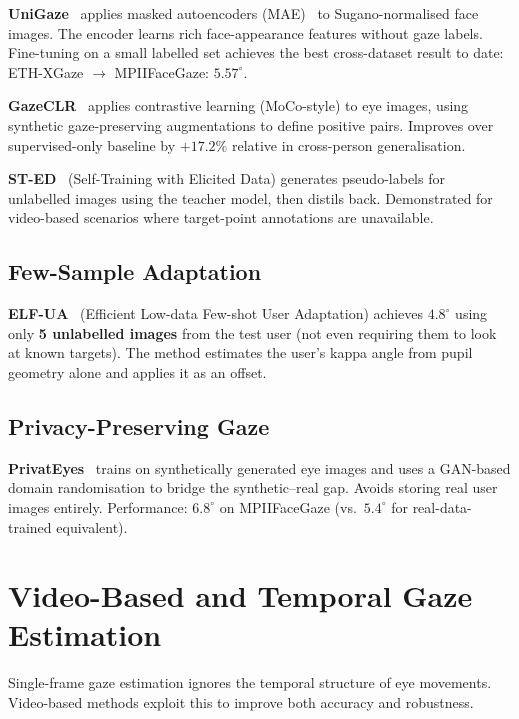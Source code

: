 \documentclass[11pt,a4paper]{article}
\begin{document}
\textbf{UniGaze}~\cite{unigaze2025} applies masked autoencoders (MAE)~\cite{he2022mae} to
Sugano-normalised face images. The encoder learns rich face-appearance features without gaze labels.
Fine-tuning on a small labelled set achieves the best cross-dataset result to date:
ETH-XGaze $\to$ MPIIFaceGaze: $5.57^\circ$.

\textbf{GazeCLR}~\cite{gaze_clr2022} applies contrastive learning (MoCo-style) to eye images,
using synthetic gaze-preserving augmentations to define positive pairs.
Improves over supervised-only baseline by $+17.2\%$ relative in cross-person generalisation.

\textbf{ST-ED}~\cite{park2020sted} (Self-Training with Elicited Data) generates pseudo-labels
for unlabelled images using the teacher model, then distils back.
Demonstrated for video-based scenarios where target-point annotations are unavailable.

\subsection{Few-Sample Adaptation}

\textbf{ELF-UA}~\cite{elfua2023} (Efficient Low-data Few-shot User Adaptation)
achieves $4.8^\circ$ using only \textbf{5 unlabelled images} from the test user (not
even requiring them to look at known targets).  The method estimates the user's kappa angle
from pupil geometry alone and applies it as an offset.

\subsection{Privacy-Preserving Gaze}

\textbf{PrivatEyes}~\cite{biswas2021privateeyes} trains on synthetically generated eye
images and uses a GAN-based domain randomisation to bridge the synthetic--real gap.
Avoids storing real user images entirely.
Performance: $6.8^\circ$ on MPIIFaceGaze (vs.\ $5.4^\circ$ for real-data-trained equivalent).

\section{Video-Based and Temporal Gaze Estimation}
\label{sec:temporal}

Single-frame gaze estimation ignores the temporal structure of eye movements.
Video-based methods exploit this to improve both accuracy and robustness.
\end{document}
